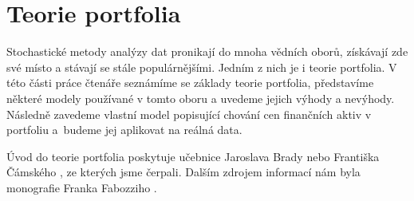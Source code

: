 \documentclass[a4paper,12pt]{report}
\theoremstyle{definition} \newtheorem{definice}[veta]{Definice}
\theoremstyle{remark}
\begin{document}
\chapter{Teorie portfolia}\label{teorie_portfolia_kap}
%
%
%
%

Stochastické metody analýzy dat pronikají do mnoha vědních oborů, získávají zde své místo a stávají se stále populárnějšími.
Jedním z nich je i teorie portfolia.
V této části práce čtenáře seznámíme se základy teorie portfolia, představíme některé modely používané v tomto oboru a uvedeme jejich výhody a nevýhody.
Následně zavedeme vlastní model popisující chování cen finančních aktiv v portfoliu a~budeme jej aplikovat na reálná data.

Úvod do teorie portfolia poskytuje učebnice Jaroslava Brady \cite{bradateorie} nebo Františka Čámského \cite{vcamskyteorie}, ze kterých jsme čerpali.
Dalším zdrojem informací nám byla monografie Franka Fabozziho \cite{fabozziportfolio}.
\end{document}
